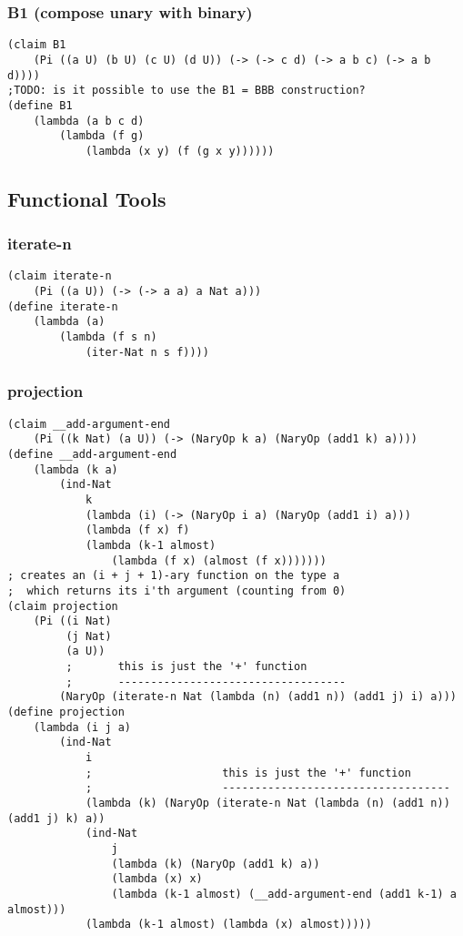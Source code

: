 \subsubsection{B1 (compose unary with binary)} \label{code:B1}
\begin{verbatim}
(claim B1
    (Pi ((a U) (b U) (c U) (d U)) (-> (-> c d) (-> a b c) (-> a b d))))
;TODO: is it possible to use the B1 = BBB construction?
(define B1
    (lambda (a b c d)
        (lambda (f g)
            (lambda (x y) (f (g x y))))))
\end{verbatim}


\subsection{Functional Tools}

\subsubsection{iterate-n} \label{code:iterate-n}
\begin{verbatim}
(claim iterate-n
    (Pi ((a U)) (-> (-> a a) a Nat a)))
(define iterate-n
    (lambda (a)
        (lambda (f s n)
            (iter-Nat n s f))))
\end{verbatim}

\subsubsection{projection} \label{code:projection}
\begin{verbatim}
(claim __add-argument-end
    (Pi ((k Nat) (a U)) (-> (NaryOp k a) (NaryOp (add1 k) a))))
(define __add-argument-end
    (lambda (k a)
        (ind-Nat
            k
            (lambda (i) (-> (NaryOp i a) (NaryOp (add1 i) a)))
            (lambda (f x) f)
            (lambda (k-1 almost) 
                (lambda (f x) (almost (f x)))))))
; creates an (i + j + 1)-ary function on the type a 
;  which returns its i'th argument (counting from 0)
(claim projection
    (Pi ((i Nat)
         (j Nat)
         (a U))
         ;       this is just the '+' function
         ;       -----------------------------------
        (NaryOp (iterate-n Nat (lambda (n) (add1 n)) (add1 j) i) a)))
(define projection
    (lambda (i j a)
        (ind-Nat
            i
            ;                    this is just the '+' function
            ;                    -----------------------------------
            (lambda (k) (NaryOp (iterate-n Nat (lambda (n) (add1 n)) (add1 j) k) a))
            (ind-Nat
                j
                (lambda (k) (NaryOp (add1 k) a))
                (lambda (x) x)
                (lambda (k-1 almost) (__add-argument-end (add1 k-1) a almost)))
            (lambda (k-1 almost) (lambda (x) almost)))))
\end{verbatim}

